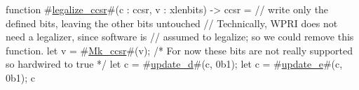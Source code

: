 function #\hyperref[sailRISCVzlegalizzezyccsr]{legalize\_ccsr}#(c : ccsr, v : xlenbits) -> ccsr = {
  // write only the defined bits, leaving the other bits untouched
  // Technically, WPRI does not need a legalizer, since software is
  // assumed to legalize; so we could remove this function.
  let v = #\hyperref[sailRISCVzMkzyccsr]{Mk\_ccsr}#(v);
  /* For now these bits are not really supported so hardwired to true */
  let c = #\hyperref[sailRISCVzupdatezyd]{update\_d}#(c, 0b1);
  let c = #\hyperref[sailRISCVzupdatezye]{update\_e}#(c, 0b1);
  c
}
